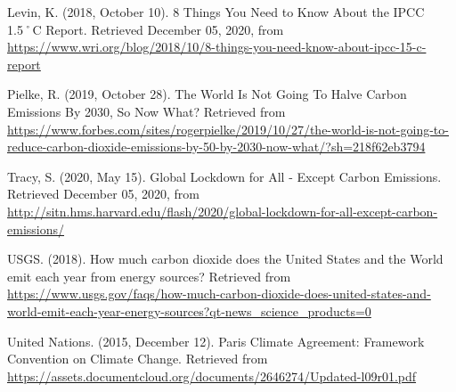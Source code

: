 \documentclass[
]{article}
\begin{document}
Levin, K. (2018, October 10). 8 Things You Need to Know About the IPCC
1.5˚C Report. Retrieved December 05, 2020, from
\url{https://www.wri.org/blog/2018/10/8-things-you-need-know-about-ipcc-15-c-report}

Pielke, R. (2019, October 28). The World Is Not Going To Halve Carbon
Emissions By 2030, So Now What? Retrieved from
\url{https://www.forbes.com/sites/rogerpielke/2019/10/27/the-world-is-not-going-to-reduce-carbon-dioxide-emissions-by-50-by-2030-now-what/?sh=218f62eb3794}

Tracy, S. (2020, May 15). Global Lockdown for All - Except Carbon
Emissions. Retrieved December 05, 2020, from
\url{http://sitn.hms.harvard.edu/flash/2020/global-lockdown-for-all-except-carbon-emissions/}

USGS. (2018). How much carbon dioxide does the United States and the
World emit each year from energy sources? Retrieved from
\url{https://www.usgs.gov/faqs/how-much-carbon-dioxide-does-united-states-and-world-emit-each-year-energy-sources?qt-news_science_products=0}

United Nations. (2015, December 12). Paris Climate Agreement: Framework
Convention on Climate Change. Retrieved from
\url{https://assets.documentcloud.org/documents/2646274/Updated-l09r01.pdf}
\end{document}
